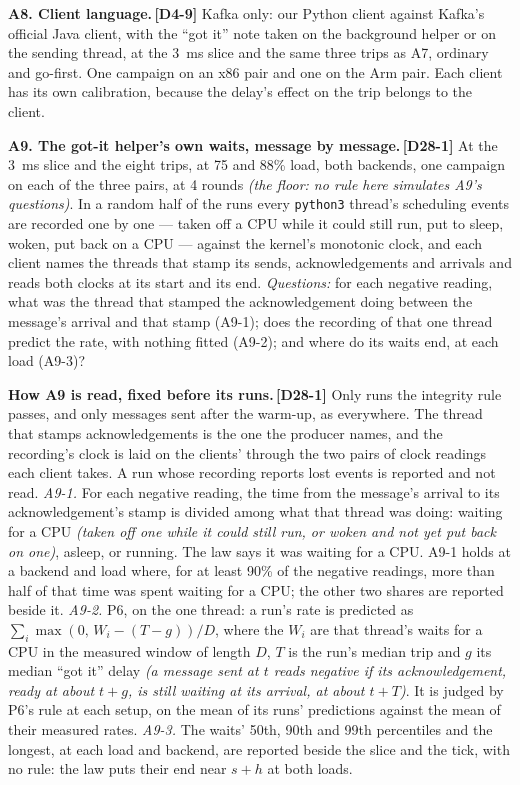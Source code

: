 \documentclass[11pt]{article}
\newcommand{\gl}[1]{{\color{soft}\itshape\small (#1)}}
\newcommand{\chg}[1]{\,{\color{chgcol}\bfseries\footnotesize[#1]}}
\newcommand{\chgold}[1]{\,{\color{oldcol}\bfseries\footnotesize[#1]}}
\begin{document}
\textbf{A8. Client language.}\chgold{D4-9} Kafka only: our Python client against Kafka's official Java client, with the ``got it'' note taken on the background helper or on the sending thread, at the 3~ms slice and the same three trips as A7, ordinary and go-first. One campaign on an x86 pair and one on the Arm pair. Each client has its own calibration, because the delay's effect on the trip belongs to the client.

\textbf{A9. The got-it helper's own waits, message by message.}\chg{D28-1} At the 3~ms slice and the eight trips, at 75 and 88\% load, both backends, one campaign on each of the three pairs, at 4 rounds \gl{the floor: no rule here simulates A9's questions}. In a random half of the runs every \texttt{python3} thread's scheduling events are recorded one by one --- taken off a CPU while it could still run, put to sleep, woken, put back on a CPU --- against the kernel's monotonic clock, and each client names the threads that stamp its sends, acknowledgements and arrivals and reads both clocks at its start and its end. \emph{Questions:} for each negative reading, what was the thread that stamped the acknowledgement doing between the message's arrival and that stamp (A9-1); does the recording of that one thread predict the rate, with nothing fitted (A9-2); and where do its waits end, at each load (A9-3)?

\textbf{How A9 is read, fixed before its runs.}\chg{D28-1} Only runs the integrity rule passes, and only messages sent after the warm-up, as everywhere. The thread that stamps acknowledgements is the one the producer names, and the recording's clock is laid on the clients' through the two pairs of clock readings each client takes. A run whose recording reports lost events is reported and not read. \emph{A9-1.} For each negative reading, the time from the message's arrival to its acknowledgement's stamp is divided among what that thread was doing: waiting for a CPU \gl{taken off one while it could still run, or woken and not yet put back on one}, asleep, or running. The law says it was waiting for a CPU. A9-1 holds at a backend and load where, for at least 90\% of the negative readings, more than half of that time was spent waiting for a CPU; the other two shares are reported beside it. \emph{A9-2.} P6, on the one thread: a run's rate is predicted as $\sum_i \max(0,\, W_i - (T - g))/D$, where the $W_i$ are that thread's waits for a CPU in the measured window of length $D$, $T$ is the run's median trip and $g$ its median ``got it'' delay \gl{a message sent at $t$ reads negative if its acknowledgement, ready at about $t + g$, is still waiting at its arrival, at about $t + T$}. It is judged by P6's rule at each setup, on the mean of its runs' predictions against the mean of their measured rates. \emph{A9-3.} The waits' 50th, 90th and 99th percentiles and the longest, at each load and backend, are reported beside the slice and the tick, with no rule: the law puts their end near $s + h$ at both loads.
\end{document}
